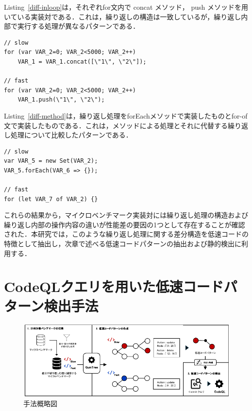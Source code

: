 \documentclass[submit,techrep,noauthor]{ipsj}
\begin{document}
Listing~\ref{diff-inloop}は，それぞれfor文内で concat メソッド， push メソッドを用いている実装対である．これは，繰り返しの構造は一致しているが，繰り返し内部で実行する処理が異なるパターンである．
\begin{lstlisting}[caption=Pairs with differences within the loop, label=diff-inloop, captionpos=t, columns=flexible]
// slow
for (var VAR_2=0; VAR_2<5000; VAR_2++)
    VAR_1 = VAR_1.concat([\"1\", \"2\"]);

// fast
for (var VAR_2=0; VAR_2<5000; VAR_2++)
    VAR_1.push(\"1\", \"2\");
\end{lstlisting}

Listing~\ref{diff-method}は，繰り返し処理をforEachメソッドで実装したものとfor-of文で実装したものである．これは，メソッドによる処理とそれに代替する繰り返し処理について比較したパターンである．
\begin{lstlisting}[caption=Pairs of Method and alternative loop, label=diff-method, captionpos=t, columns=flexible]
// slow
var VAR_5 = new Set(VAR_2);
VAR_5.forEach(VAR_6 => {});

// fast
for (let VAR_7 of VAR_2) {}
\end{lstlisting}

これらの結果から，マイクロベンチマーク実装対には繰り返し処理の構造および繰り返し内部の操作内容の違いが性能差の要因の1つとして存在することが確認された．本研究では，このような繰り返し処理に関する差分構造を低速コードの特徴として抽出し，次章で述べる低速コードパターンの抽出および静的検出に利用する．


\section{CodeQLクエリを用いた低速コードパターン検出手法}
\label{sec:approach}

\begin{figure}[t]
    \centering
    \includegraphics[width=1.0\linewidth]{./Noguchi_fig/approach_abst.pdf}
    \caption{手法概略図}
    \label{fig:Approach}
\end{figure}
\end{document}
